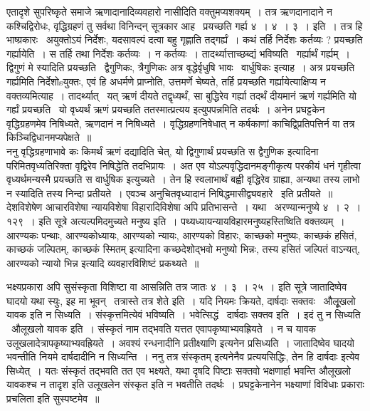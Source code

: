 \documentclass[11pt, openany]{book}
\begin{document}
एतादृशे सुपरिष्कृते समाजे ऋणादानादिव्यवहारो नासीदिति वक्तुमप्यशक्यम्~। तत्र ऋणदानादाने न कश्चिद्विरोधः, वृद्धिग्रहणं तु सर्वथा विनिन्दन् सूत्रकार आह \textendash\ प्रयच्छति गर्ह्य ४~। ४~। ३~। इति~। तत्र हि भाष्ग्रकारः \textendash\ {\qt अयुक्तोऽयं निर्देशः, यदसावल्पं दत्वा बहु गृह्णाति तद्गर्ह्यं~।} कथं तर्हि निर्देशः कर्तव्यः ? प्रयच्छति गर्ह्यायेति~। स तर्हि तथा निर्देशः कर्तव्यः~। न कर्तव्यः~। तादर्थ्यात्ताच्छब्द्यं भविष्यति \textendash\ गर्ह्यार्थं गर्ह्यम्~। द्विगुणं मे स्यादिति प्रयच्छति \textendash\ द्वैगुणिकः, त्रैगुणिकः अत्र वृद्धेर्वृधुषि भावः \textendash\ वार्धुषिकः इत्याह~। अत्र प्रयच्छति गर्ह्यमिति निर्देशोsयुक्तः, एवं हि अधर्मणे प्राप्नोति, उत्तमर्णे चेष्यते, तर्हि प्रयच्छति गर्ह्यायेत्याक्षिप्य न वक्तव्यमित्याह~। तादर्थ्यात् \textendash\ यत् ऋणं दीयते तद्वृध्यर्थं, सा बुद्धिरेव गर्ह्या तदर्थं दीयमानं ऋणं गर्ह्यमिति यो गर्ह्यं प्रयच्छति \textendash\ यो वृध्यर्थं ऋणं प्रयच्छति ततस्मात्प्रत्यय इत्युपपन्नमिति तदर्थः~। अनेन प्रघट्टकेन वृद्धिग्रहणमेव निषिध्यते, ऋणदानं न निषिध्यते~। वृद्धिग्रहणनिषेधात् न कर्षकाणां काचिद्वि्प्रतिपत्तिर्न वा तत्र किञ्चिद्विधानमप्यपेक्षते~॥\\

ननु वृद्धिग्रहणाभावे कः किमर्थं ऋणं दद्यादिति चेत्, यो द्विगुणार्थं प्रयच्छति स द्वैगुणिक इत्यादिना परिमितवृध्यतिरिक्ता वृद्विरेव निषिद्धेति तदभिप्रायः~। अत एव योऽल्पवृद्धिदानमङ्गीकृत्य परकीयं धनं गृहीत्वा वृध्यर्थमन्यस्मै प्रयच्छति स वार्धुषिक इत्युच्यते~। तेन हि स्वलाभार्थं बह्वी वृद्धिरेव ग्राह्या, अन्यथा तस्य लाभो न स्यादिति तस्य निन्दा प्रतीयते~। एवञ्च अनुचितवृध्यादानं निषिद्धमासीद्व्यवहारे \textendash\ इति प्रतीयते~॥\\

देशविशेषेण आचारविशेषा न्यायविशेषा विहारादिविशेषा अपि प्रतिभासन्ते~। यथा \textendash\ अरण्यान्मनुष्ये ४~। २~। १२९~। इति सूत्रे {\qt अत्यल्पमिदमुच्यते मनुष्य इति~। पथ्यध्यायन्यायविहारमनुष्यहस्तिष्विति वक्तव्यम्~। आरण्यकः पन्थाः, आरण्यकोध्यायः, आरण्यको न्यायः, आरण्यको विहारः, काच्छको मनुष्यः, काच्छकं हसितं, काच्छकं जल्पितम्, काच्छकं स्मितम्} इत्यादिना कच्छदेशोद्भवो मनुष्यो भिन्नः, तस्य हसितं जल्पितं वाऽन्यत्, आरण्यको न्यायो भिन्न इत्यादि व्यवहारविशिष्टं प्रकथ्यते~॥\\

\newpage

भक्ष्यप्रकारा अपि सुसंस्कृता विशिष्टा वा आसन्निति तत्र जातः ४~। ३~। २५~। इति सूत्रे जातादिष्वेव घादयो यथा स्युः, इह मा भूवन् \textendash\ तत्रास्ते तत्र शेते इति~। यदि नियमः क्रियते, दार्षदाः सक्तवः \textendash\ औलृूखलो यावक इति न सिध्यति~। संस्कृत्तमित्येवं भविष्यति~। भवेत्सिद्धं \textendash\ दार्षदाः सक्तव इति~। इदं तु न सिध्यति \textendash\ औलूखलो यावक इति~। संस्कृतं नाम तद्भवति यत्तत एवापकृष्याभ्यवह्रियते~। न च यावक उलूखलादेत्रापकृष्याभ्यवह्रियते~। अवश्यं रन्धनादीनि प्रतीक्ष्याणि इत्यनेन प्रसिध्यति~। जातादिष्वेव घादयो भवन्तीति नियमे दार्षदादीनि न सिध्यन्ति~। ननु तत्र {\qt संस्कृतम्} इत्यनेनैव प्रत्ययसिद्धिः, तेन हि {\qt दार्षदाः} इत्येव सिध्येत्~। यतः संस्कृतं तद्भवति तत एव भक्ष्यते, यथा दृषदि पिष्टाः सक्तवो भक्षणार्हा भवन्ति औलूखलो यावकश्च न तादृश इति उलूखलेन संस्कृत इति न भवतीति तदर्थः~। प्रघट्टकेनानेन भक्ष्याणां विविधाः प्रकाराः प्रचलिता इति सुस्पष्टमेव~॥\\
\end{document}
